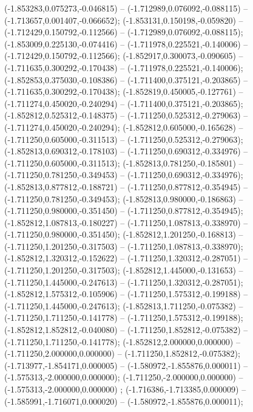  (-1.853283,0.075273,-0.046815) -- (-1.712989,0.076092,-0.088115) -- (-1.713657,0.001407,-0.066652);
 (-1.853131,0.150198,-0.059820) -- (-1.712429,0.150792,-0.112566) -- (-1.712989,0.076092,-0.088115);
 (-1.853009,0.225130,-0.074416) -- (-1.711978,0.225521,-0.140006) -- (-1.712429,0.150792,-0.112566);
 (-1.852917,0.300073,-0.090605) -- (-1.711635,0.300292,-0.170438) -- (-1.711978,0.225521,-0.140006);
 (-1.852853,0.375030,-0.108386) -- (-1.711400,0.375121,-0.203865) -- (-1.711635,0.300292,-0.170438);
 (-1.852819,0.450005,-0.127761) -- (-1.711274,0.450020,-0.240294) -- (-1.711400,0.375121,-0.203865);
 (-1.852812,0.525312,-0.148375) -- (-1.711250,0.525312,-0.279063) -- (-1.711274,0.450020,-0.240294);
 (-1.852812,0.605000,-0.165628) -- (-1.711250,0.605000,-0.311513) -- (-1.711250,0.525312,-0.279063);
 (-1.852813,0.690312,-0.178103) -- (-1.711250,0.690312,-0.334976) -- (-1.711250,0.605000,-0.311513);
 (-1.852813,0.781250,-0.185801) -- (-1.711250,0.781250,-0.349453) -- (-1.711250,0.690312,-0.334976);
 (-1.852813,0.877812,-0.188721) -- (-1.711250,0.877812,-0.354945) -- (-1.711250,0.781250,-0.349453);
 (-1.852813,0.980000,-0.186863) -- (-1.711250,0.980000,-0.351450) -- (-1.711250,0.877812,-0.354945);
 (-1.852812,1.087813,-0.180227) -- (-1.711250,1.087813,-0.338970) -- (-1.711250,0.980000,-0.351450);
 (-1.852812,1.201250,-0.168813) -- (-1.711250,1.201250,-0.317503) -- (-1.711250,1.087813,-0.338970);
 (-1.852812,1.320312,-0.152622) -- (-1.711250,1.320312,-0.287051) -- (-1.711250,1.201250,-0.317503);
 (-1.852812,1.445000,-0.131653) -- (-1.711250,1.445000,-0.247613) -- (-1.711250,1.320312,-0.287051);
 (-1.852812,1.575312,-0.105906) -- (-1.711250,1.575312,-0.199188) -- (-1.711250,1.445000,-0.247613);
 (-1.852813,1.711250,-0.075382) -- (-1.711250,1.711250,-0.141778) -- (-1.711250,1.575312,-0.199188);
 (-1.852812,1.852812,-0.040080) -- (-1.711250,1.852812,-0.075382) -- (-1.711250,1.711250,-0.141778);
 (-1.852812,2.000000,0.000000) -- (-1.711250,2.000000,0.000000) -- (-1.711250,1.852812,-0.075382);
 (-1.713977,-1.854171,0.000005) -- (-1.580972,-1.855876,0.000011) -- (-1.575313,-2.000000,0.000000);
 (-1.711250,-2.000000,0.000000) -- (-1.575313,-2.000000,0.000000) ;
 (-1.716386,-1.713385,0.000009) -- (-1.585991,-1.716071,0.000020) -- (-1.580972,-1.855876,0.000011);
